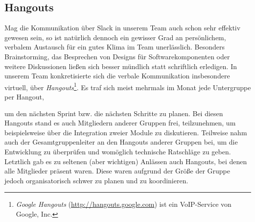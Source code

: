 
\subsection{Hangouts}
\label{team:group-slack}

Mag die Kommunikation über Slack in unserem Team auch schon sehr effektiv
gewesen sein, so ist natürlich dennoch ein gewisser Grad an persönlichem,
verbalem Austausch für ein gutes Klima im Team unerlässlich. Besonders Brainstorming, das Besprechen von Designs für
Softwarekomponenten oder weitere Diskussionen ließen sich besser mündlich statt schriftlich erledigen. In unserem Team konkretisierte sich die verbale Kommunikation
insbesondere virtuell, über \emph{Hangouts}\footnote{\emph{Google Hangouts}
(\url{http://hangouts.google.com}) ist ein VoIP-Service von Google, Inc.}. Es
traf sich meist mehrmals im Monat jede Untergruppe per Hangout,

\vspace{0.2cm}
\pagebreak

um den nächsten Sprint bzw. die nächsten Schritte zu planen. Bei diesen Hangouts
stand es auch Mitgliedern anderer Gruppen frei, teilzunehmen, um beispielsweise
über die Integration zweier Module zu diskutieren. Teilweise nahm auch der
Gesamtgruppenleiter an den Hangouts anderer Gruppen bei, um die Entwicklung zu
überprüfen und womöglich technische Ratschläge zu geben. Letztlich gab es zu
seltenen (aber wichtigen) Anlässen auch Hangouts, bei denen alle Mitglieder
präsent waren. Diese waren aufgrund der Größe der Gruppe jedoch organisatorisch
schwer zu planen und zu koordinieren.
